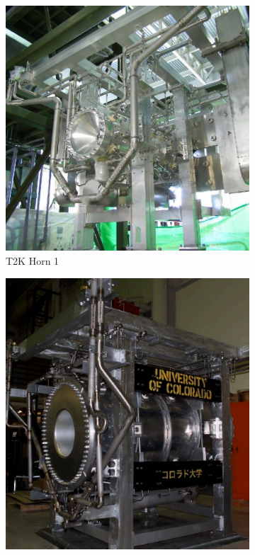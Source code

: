 \begin{figure}
    \centering
     \begin{subfigure}[b]{0.33\linewidth}
      \includegraphics[width=\linewidth]{Figures/horn1.PNG}
      \caption{T2K Horn 1}
      \label{fig:horn1} 
     \end{subfigure}
     \begin{subfigure}[b]{0.33\linewidth}
       \includegraphics[width=\linewidth]{Figures/horn2.PNG}

\end{subfigure}
\end{figure}
